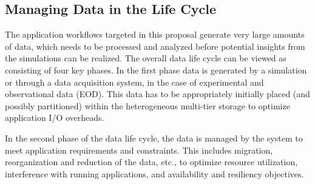 \subsection{Managing Data in the Life Cycle}
\label{sec:managing-data-life}

\newcommand{\Sir}{Sirocco} %


The application workflows targeted in this proposal generate very large
amounts of data, which needs to be processed and analyzed before
potential insights from the simulations can be realized. 
The overall data life cycle can be viewed as consisting of four key phases. In the first phase data 
is generated by a simulation or through a data acquisition system,
in the case of experimental and observational data (EOD). This data has 
to be appropriately initially placed (and possibly partitioned) within the heterogeneous 
multi-tier storage to optimize application I/O overheads.

In the second phase of the data life cycle, the data is managed by the system to 
meet application requirements and constraints. This includes migration, 
reorganization and reduction of the data, etc., to optimize resource
utilization, interference with running applications, and availability and
resiliency objectives. 
%

